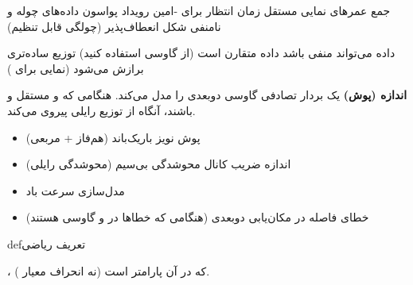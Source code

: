 
\lr{\mbox{\PSyes{}}} جمع عمرهای نمایی مستقل\PSbr{}\lr{\mbox{\PSyes{}}} زمان انتظار برای -امین رویداد پواسون\PSbr{}\lr{\mbox{\PSyes{}}} داده‌های چوله و نامنفی\PSbr{}\lr{\mbox{\PSyes{}}} شکل انعطاف‌پذیر (چولگی قابل تنظیم)


\lr{\mbox{\PSno{}}} داده می‌تواند منفی باشد\PSbr{}\lr{\mbox{\PSno{}}} داده متقارن است (از گاوسی استفاده کنید)\PSbr{}\lr{\mbox{\PSno{}}} توزیع ساده‌تری برازش می‌شود (نمایی برای )



\textbf{اندازه (پوش)} یک بردار تصادفی گاوسی دوبعدی را مدل می‌کند. هنگامی که  و  مستقل و  باشند، آنگاه  از توزیع رایلی پیروی می‌کند.


\begin{itemize}
\tightlist
\item
  پوش نویز باریک‌باند (هم‌فاز + مربعی)
\item
  اندازه ضریب کانال محوشدگی بی‌سیم (محوشدگی رایلی)
\item
  مدل‌سازی سرعت باد
\item
  خطای فاصله در مکان‌یابی دوبعدی (هنگامی که خطاها در  و  گاوسی هستند)
\end{itemize}

\begin{PSbox}[unbreakable]{def}{تعریف ریاضی}

، که در آن \lr{$\sigma$} پارامتر است (نه انحراف معیار ).

\end{PSbox}








